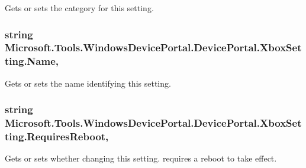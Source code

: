 Gets or sets the category for this setting. 

\subsubsection[{\texorpdfstring{Name}{Name}}]{\setlength{\rightskip}{0pt plus 5cm}string Microsoft.\+Tools.\+Windows\+Device\+Portal.\+Device\+Portal.\+Xbox\+Setting.\+Name\hspace{0.3cm}{\ttfamily [get]}, {\ttfamily [set]}}\hypertarget{class_microsoft_1_1_tools_1_1_windows_device_portal_1_1_device_portal_1_1_xbox_setting_a60b2a6ed911aaf220b5d039d45ab5efd}{}\label{class_microsoft_1_1_tools_1_1_windows_device_portal_1_1_device_portal_1_1_xbox_setting_a60b2a6ed911aaf220b5d039d45ab5efd}


Gets or sets the name identifying this setting. 

\subsubsection[{\texorpdfstring{Requires\+Reboot}{RequiresReboot}}]{\setlength{\rightskip}{0pt plus 5cm}string Microsoft.\+Tools.\+Windows\+Device\+Portal.\+Device\+Portal.\+Xbox\+Setting.\+Requires\+Reboot\hspace{0.3cm}{\ttfamily [get]}, {\ttfamily [set]}}\hypertarget{class_microsoft_1_1_tools_1_1_windows_device_portal_1_1_device_portal_1_1_xbox_setting_a0bba2f18e03f57ea5446f17fc45149b1}{}\label{class_microsoft_1_1_tools_1_1_windows_device_portal_1_1_device_portal_1_1_xbox_setting_a0bba2f18e03f57ea5446f17fc45149b1}


Gets or sets whether changing this setting. requires a reboot to take effect. 

